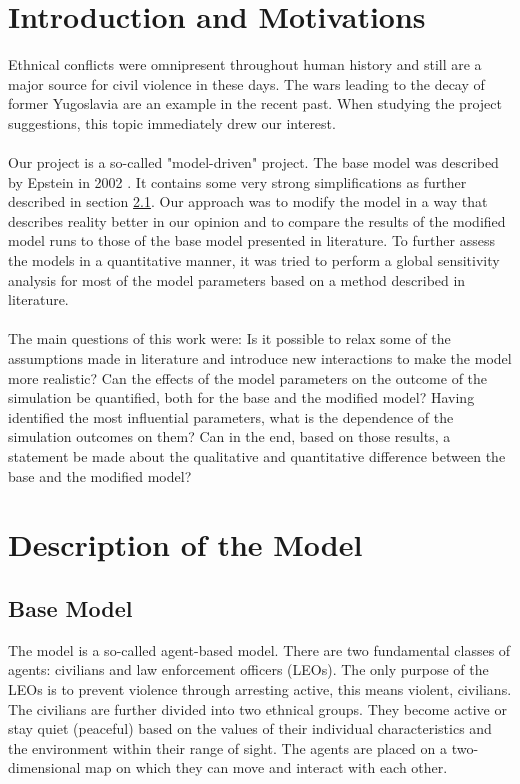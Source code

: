 \documentclass[11pt]{article}
\begin{document}
\section{Introduction and Motivations}
Ethnical conflicts were omnipresent throughout human history and still are a major source for civil violence in these days. The wars leading to the decay of former Yugoslavia are an example in the recent past. When studying the project suggestions, this topic immediately drew our interest.\\
\\
Our project is a so-called "model-driven" project. The base model was described by Epstein in 2002 \cite{Epstein2002}. It contains some very strong simplifications as further described in section \ref{subsec:base_model}. Our approach was to modify the model in a way that describes reality better in our opinion and to compare the results of the modified model runs to those of the base model presented in literature. To further assess the models in a quantitative manner, it was tried to perform a global sensitivity analysis for most of the model parameters based on a method described in literature.\\
\\
The main questions of this work were: Is it possible to relax some of the assumptions made in literature and introduce new interactions to make the model more realistic? Can the effects of the model parameters on the outcome of the simulation be quantified, both for the base and the modified model? Having identified the most influential parameters, what is the dependence of the simulation outcomes on them? Can in the end, based on those results, a statement be made about the qualitative and quantitative difference between the base and the modified model?

\section{Description of the Model}
\label{sec:description_model}

\subsection{Base Model \cite{Epstein2002,Fonoberova2013}}
\label{subsec:base_model}
The model is a so-called agent-based model. There are two fundamental classes of agents: civilians and law enforcement officers (LEOs). The only purpose of the LEOs is to prevent violence through arresting active, this means violent, civilians. The civilians are further divided into two ethnical groups. They become active or stay quiet (peaceful) based on the values of their individual characteristics and the environment within their range of sight. The agents are placed on a two-dimensional map on which they can move and interact with each other.
\end{document}
